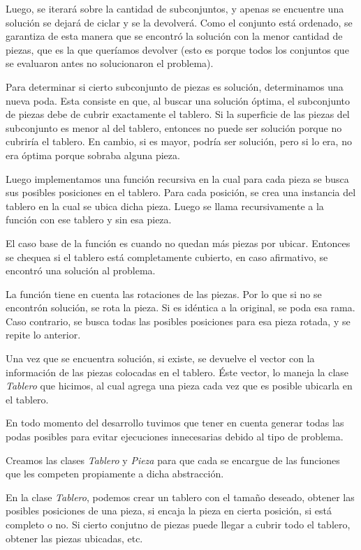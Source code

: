 \quad Luego, se iterará sobre la cantidad de subconjuntos, y apenas se encuentre una solución se dejará de ciclar y se la devolverá. Como el conjunto está ordenado, se garantiza de esta manera que se encontró la solución con la menor cantidad de piezas, que es la que queríamos devolver (esto es porque todos los conjuntos que se evaluaron antes no solucionaron el problema).


\quad Para determinar si cierto subconjunto de piezas es soluci\'on, determinamos una nueva poda. Esta consiste en que, al buscar una soluci\'on \'optima, el subconjunto de piezas debe de cubrir exactamente el tablero. Si la superficie de las piezas del subconjunto es menor al del tablero, entonces no puede ser soluci\'on porque no cubriría el tablero. En cambio, si es mayor, podr\'ia ser soluci\'on, pero si lo era, no era \'optima porque sobraba alguna pieza.



\quad Luego implementamos una funci\'on recursiva en la cual para cada pieza se busca sus posibles posiciones en el tablero. Para cada posici\'on, se crea una instancia del tablero en la cual se ubica dicha pieza. Luego se llama recursivamente a la funci\'on con ese tablero y sin esa pieza.

\quad El caso base de la funci\'on es cuando no quedan m\'as piezas por ubicar. Entonces se chequea si el tablero est\'a completamente cubierto, en caso afirmativo, se encontr\'o una soluci\'on al problema.

\quad La funci\'on tiene en cuenta las rotaciones de las piezas. Por lo que si no se encontr\'on soluci\'on, se rota la pieza. Si es id\'entica a la original, se poda esa rama. Caso contrario, se busca todas las posibles posiciones para esa pieza rotada, y se repite lo anterior.

\quad Una vez que se encuentra soluci\'on, si existe, se devuelve el vector con la informaci\'on de las piezas colocadas en el tablero. \'Este vector, lo maneja la clase \textit{Tablero} que hicimos, al cual agrega una pieza cada vez que es posible ubicarla en el tablero.

\quad En todo momento del desarrollo tuvimos que tener en cuenta generar todas las podas posibles para evitar ejecuciones innecesarias debido al tipo de problema.

\quad Creamos las clases \textit{Tablero} y \textit{Pieza} para que cada se encargue de las funciones que les competen propiamente a dicha abstracci\'on. 

\quad En la clase \textit{Tablero}, podemos crear un tablero con el tama\~no deseado, obtener las posibles posiciones de una pieza, si encaja la pieza en cierta posici\'on, si est\'a completo o no. Si cierto conjutno de piezas puede llegar a cubrir todo el tablero, obtener las piezas ubicadas, etc.

